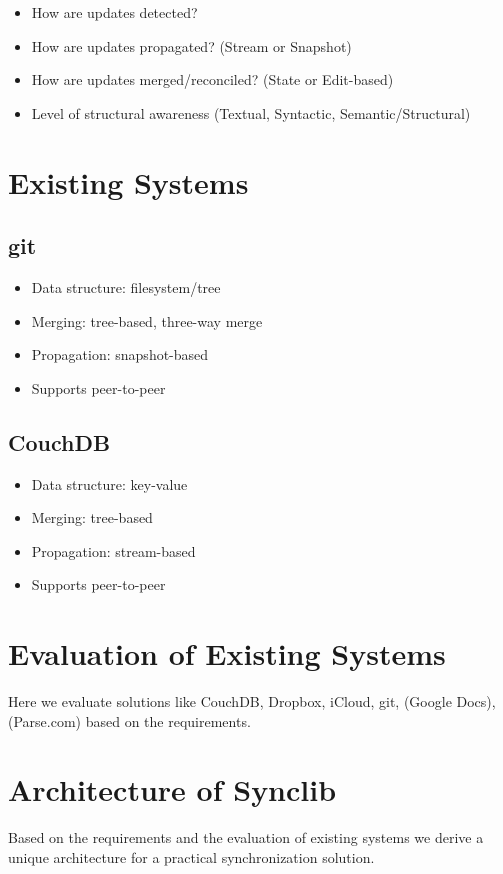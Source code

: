 \begin{itemize}
\item How are updates detected?
\item How are updates propagated? (Stream or Snapshot)
\item How are updates merged/reconciled? (State or Edit-based)
\item Level of structural awareness (Textual, Syntactic, Semantic/Structural)
\end{itemize}

\section{Existing Systems}

\subsection{git}

\begin{itemize}
\item
  Data structure: filesystem/tree
\item
  Merging: tree-based, three-way merge
\item
  Propagation: snapshot-based
\item
  Supports peer-to-peer
\end{itemize}

\subsection{CouchDB}

\begin{itemize}
\item
  Data structure: key-value
\item
  Merging: tree-based
\item
  Propagation: stream-based
\item
  Supports peer-to-peer
\end{itemize}

\section{Evaluation of Existing Systems}
Here we evaluate solutions like CouchDB, Dropbox, iCloud, git, (Google Docs), (Parse.com) based on the requirements.

\section{Architecture of Synclib}
Based on the requirements and the evaluation of existing systems we derive a unique architecture for a practical synchronization solution.

